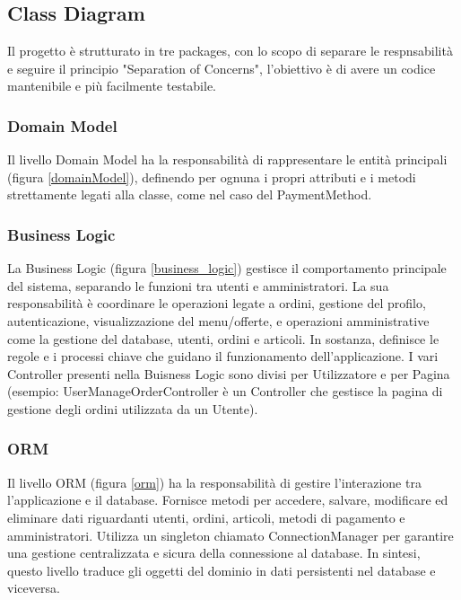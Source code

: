 \documentclass{article}
\begin{document}
            
\subsection{Class Diagram}
Il progetto è strutturato in tre packages, con lo scopo di separare le respnsabilità e seguire il principio "Separation of Concerns", l'obiettivo è di avere un codice mantenibile e più facilmente testabile.

\subsubsection{Domain Model}
Il livello Domain Model ha la responsabilità di rappresentare le entità principali (figura \ref{domainModel}), definendo per ognuna i propri attributi e i metodi strettamente legati alla classe, come nel caso del PaymentMethod.

\subsubsection{Business Logic}
La Business Logic (figura \ref{business_logic}) gestisce il comportamento principale del sistema, separando le funzioni tra utenti e amministratori. La sua responsabilità è coordinare le operazioni legate a ordini, gestione del profilo, autenticazione, visualizzazione del menu/offerte, e operazioni amministrative come la gestione del database, utenti, ordini e articoli. In sostanza, definisce le regole e i processi chiave che guidano il funzionamento dell'applicazione. I vari Controller presenti nella Buisness Logic sono divisi per Utilizzatore e per Pagina (esempio: UserManageOrderController è un Controller che gestisce la pagina di gestione degli ordini utilizzata da un Utente). 

\clearpage

\subsubsection{ORM}
Il livello ORM (figura \ref{orm}) ha la responsabilità di gestire l’interazione tra l’applicazione e il database. Fornisce metodi per accedere, salvare, modificare ed eliminare dati riguardanti utenti, ordini, articoli, metodi di pagamento e amministratori. Utilizza un singleton chiamato ConnectionManager per garantire una gestione centralizzata e sicura della connessione al database. In sintesi, questo livello traduce gli oggetti del dominio in dati persistenti nel database e viceversa.

\end{document}
